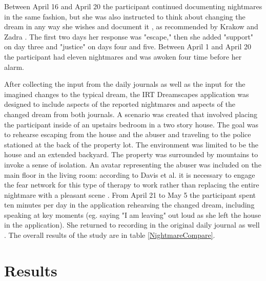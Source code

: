 \documentclass{article}
\begin{document}
Between April 16 and April 20 the participant continued documenting nightmares in the same fashion, but she was also instructed to think about changing the dream in any way she wishes and document it \cite{IRTDailyChange}, as recommended by Krakow and Zadra \cite{KrakowZadraPP}. The first two days her response was "escape," then she added "support" on day three and "justice" on days four and five. Between April 1 and April 20 the participant had eleven nightmares and was awoken four time before her alarm.

After collecting the input from the daily journals as well as the input for the imagined changes to the typical dream, the IRT Dreamscapes application was designed to include aspects of the reported nightmares and aspects of the changed dream from both journals. A scenario was created that involved placing the participant inside of an upstairs bedroom in a two story house. The goal was to rehearse escaping from the house and the abuser and traveling to the police stationed at the back of the property lot. The environment was limited to be the house and an extended backyard. The property was surrounded by mountains to invoke a sense of isolation. An avatar representing the abuser was included on the main floor in the living room: according to Davis et al. it is necessary to engage the fear network for this type of therapy to work rather than replacing the entire nightmare with a pleasant scene \cite{Davis}. From April 21 to May 5 the participant spent ten minutes per day in the application rehearsing the changed dream, including speaking at key moments (eg. saying "I am leaving" out loud as she left the house in the application). She returned to recording in the original daily journal as well \cite{IRTDaily}. The overall results of the study are in table \ref{NightmareCompare}.

\section*{Results}
\end{document}
